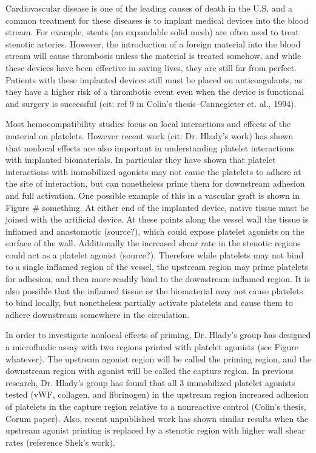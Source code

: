 

Cardiovascular disease is one of the leading causes of death in the
U.S, and a common treatment for these diseases is to implant medical
devices into the blood stream. For example, stents (an expandable
solid mesh) are often used to treat stenotic arteries. However, the
introduction of a foreign material into the blood stream will cause
thrombosis unless the material is treated somehow, and while these
devices have been effective in saving lives, they are still far from
perfect. Patients with these implanted devices still must be placed on
anticoagulants, as they have a higher risk of a thrombotic event even
when the device is functional and surgery is successful (cit: ref 9 in
Colin's thesis--Cannegieter et. al., 1994).
		

Most hemocompatibility studies focus on local interactions and effects
of the material on platelets. However recent work (cit: Dr. Hlady's
work) has shown that nonlocal effects are also important in
understanding platelet interactions with implanted biomaterials. In
particular they have shown that platelet interactions with immobilized
agonists may not cause the platelets to adhere at the site of
interaction, but can nonetheless prime them for downstream adhesion
and full activation. One possible example of this in a vascular graft
is shown in Figure \# something. At either end of the implanted
device, native tissue must be joined with the artificial device. At
these points along the vessel wall the tissue is inflamed and
anastomotic (source?), which could expose platelet agonists on the
surface of the wall. Additionally the increased shear rate in the
stenotic regions could act as a platelet agonist (source?). Therefore
while platelets may not bind to a single inflamed region of the
vessel, the upstream region may prime platelets for adhesion, and then
more readily bind to the downstream inflamed region. It is also
possible that the inflamed tissue or the biomaterial may not cause
platelets to bind locally, but nonetheless partially activate
platelets and cause them to adhere downstream somewhere in the
circulation.
		
In order to investigate nonlocal effects of priming, Dr. Hlady's group
has designed a microfluidic assay with two regions printed with
platelet agonists (see Figure whatever). The upstream agonist region
will be called the priming region, and the downstream region with
agonist will be called the capture region. In previous research,
Dr. Hlady's group has found that all 3 immobilized platelet agonists
tested (vWF, collagen, and fibrinogen) in the upstream region
increased adhesion of platelets in the capture region relative to a
nonreactive control (Colin's thesis, Corum paper). Also, recent
unpublished work has shown similar results when the upstream agonist
printing is replaced by a stenotic region with higher wall shear rates
(reference Shek's work).
